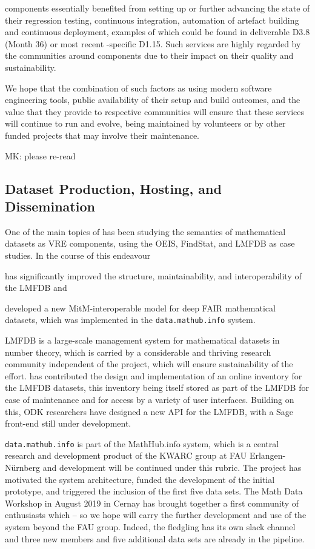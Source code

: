 \documentclass{deliverablereport}
\def\dmh{\texttt{data.mathub.info}\xspace}
\begin{document}
\ODK components essentially benefited from setting up or further
advancing the state of their regression testing, continuous
integration, automation of artefact building and continuous
deployment, examples of which could be found in deliverable
D3.8 (Month 36) or most recent \GAP-specific D1.15.
Such services are highly regarded by the communities around
\ODK components due to their impact on their quality and
sustainability.

We hope that the combination of such factors as using modern
software engineering tools, public availability of their
setup and build outcomes, and the value that they provide to
respective communities will ensure that these services will
continue to run and evolve, being maintained by volunteers
or by other funded projects that may involve their maintenance.

\begin{newpart}{MK: please re-read}
\subsection{Dataset Production, Hosting, and Dissemination}

One of the main topics of  has been studying the semantics of mathematical
datasets as VRE components, using the OEIS, FindStat, and LMFDB as case studies. In the
course of this endeavour \pn
\begin{compactenum}
\item has significantly improved the structure, maintainability, and interoperability of
  the LMFDB and
\item developed a new MitM-interoperable model for deep FAIR mathematical datasets, which
  was implemented in the \dmh system.
\end{compactenum}
LMFDB is a large-scale management system for mathematical datasets in number theory, which
is carried by a considerable and thriving research community independent of the \pn
project, which will ensure sustainability of the effort.
\pn has contributed the design and implementation of an online inventory for the LMFDB datasets,
this inventory being itself stored as part of the LMFDB for ease of maintenance and for access by a variety of user interfaces.
Building on this, ODK researchers have designed a new API for the LMFDB, with a Sage front-end still under development.




\dmh is part of the MathHub.info system, which is a central research and development
product of the KWARC group at FAU Erlangen-N\"urnberg and development will be continued
under this rubric.
The \pn project has motivated the system architecture, funded the development of the
initial prototype, and triggered the inclusion of the first five data sets.
The Math Data Workshop in August 2019 in Cernay has brought together a first community of
enthusiasts which -- so we hope will carry the further development and use of the system
beyond the FAU group.
Indeed, the fledgling has its own slack channel and three new members and five additional
data sets are already in the pipeline.
\end{newpart}
\end{document}
